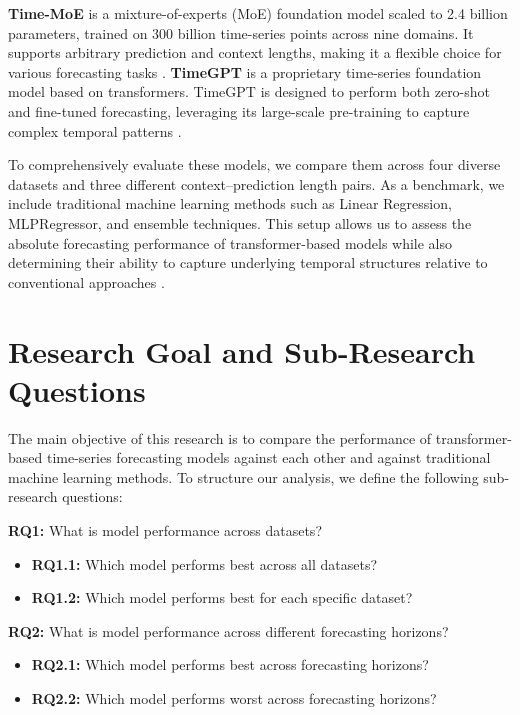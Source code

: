 \textbf{Time-MoE} is a mixture-of-experts (MoE) foundation model scaled to 2.4 billion parameters, trained on 300 billion time-series points across nine domains. It supports arbitrary prediction and context lengths, making it a flexible choice for various forecasting tasks \cite{Xie2024TemporalMB}. 
\textbf{TimeGPT} is a proprietary time-series foundation model based on transformers. TimeGPT is designed to perform both zero-shot and fine-tuned forecasting, leveraging its large-scale pre-training to capture complex temporal patterns \cite{Garza2023TimeGPT}.


To comprehensively evaluate these models, we compare them across four diverse datasets and three different context–prediction length pairs. As a benchmark, we include traditional machine learning methods such as Linear Regression, MLPRegressor, and ensemble techniques. This setup allows us to assess the absolute forecasting performance of transformer-based models while also determining their ability to capture underlying temporal structures relative to conventional approaches \cite{machines12060380}.

\section{Research Goal and Sub-Research Questions}

The main objective of this research is to compare the performance of transformer-based time-series forecasting models against each other and against traditional machine learning methods. To structure our analysis, we define the following sub-research questions:

\textbf{RQ1:} What is model performance across datasets?
\begin{itemize}
    \item \textbf{RQ1.1:} Which model performs best across all datasets?
    \item \textbf{RQ1.2:} Which model performs best for each specific dataset?
\end{itemize}
    
\textbf{RQ2:} What is model performance across different forecasting horizons?
\begin{itemize}
    \item \textbf{RQ2.1:} Which model performs best across forecasting horizons?
    \item \textbf{RQ2.2:} Which model performs worst across forecasting horizons?
\end{itemize}
    
